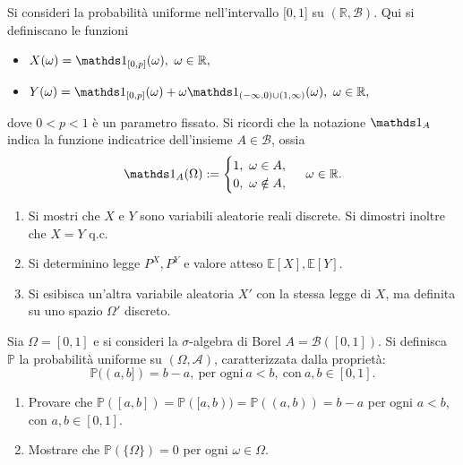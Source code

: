 Si consideri la probabilità uniforme nell'intervallo $[ 0,1$] su $(\mathbb{R} ,\mathcal{B})$. Qui si definiscano le funzioni
\begin{itemize}
\item $X( \omega ) =\Ind_{[ 0,p]}( \omega ) ,\ \omega \in \mathbb{R} ,$
\item $Y( \omega ) =\Ind_{[ 0,p]}( \omega ) +\omega \Ind_{( -\infty ,0) \cup ( 1,\infty )}( \omega ) ,\ \omega \in \mathbb{R} ,$
\end{itemize}

dove $0< p< 1$ è un parametro fissato. Si ricordi che la notazione $\Ind_{A}$ indica la funzione indicatrice dell'insieme $A\in \mathcal{B}$, ossia
\begin{equation*}
\Ind_{A}( \Omega ) :=\begin{cases}
1,\ \omega \in A,\\
0,\ \omega \notin A,
\end{cases} \ \omega \in \mathbb{R} .
\end{equation*}
\begin{enumerate}
\item Si mostri che $X$ e $Y$ sono variabili aleatorie reali discrete. Si dimostri inoltre che $X=Y$ q.c.
\item Si determinino legge $P^{X} ,P^{Y}$ e valore atteso $\mathbb{E}[ X] ,\mathbb{E}[ Y]$.
\item Si esibisca un'altra variabile aleatoria $X' $ con la stessa legge di $X$, ma definita su uno spazio $\Omega ' $ discreto.
\end{enumerate}
\Esercizio{}

Sia $\Omega =[ 0,1]$ e si consideri la $\sigma $-algebra di Borel $A=\mathcal{B}([ 0,1])$. Si definisca $\mathbb{P}$ la probabilità uniforme su $( \Omega ,\mathcal{A})$, caratterizzata dalla proprietà:
\begin{equation*}
\mathbb{P}(( a,b]) =b-a,\ \text{per ogni} \ a< b,\ \text{con} \ a,b\in [ 0,1] .
\end{equation*}
\begin{enumerate}
\item Provare che $\mathbb{P}([ a,b]) =\mathbb{P}([ a,b)) =\mathbb{P}(( a,b)) =b-a$ per ogni $a< b$, con $a,b\in [ 0,1]$.
\item Mostrare che $\mathbb{P}(\{\Omega \}) =0$ per ogni $\omega \in \Omega $.
\end{enumerate}

